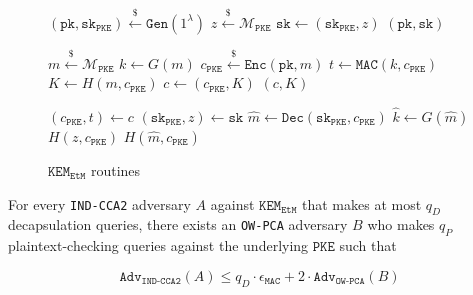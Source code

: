 \documentclass[floatrow,journal=tches,submission]{iacrtrans}
\newcommand{\pke}{\texttt{PKE}}
\newcommand{\keygen}{\texttt{Gen}}
\newcommand{\encrypt}{\texttt{Enc}}
\newcommand{\decrypt}{\texttt{Dec}}
\newcommand{\kem}{\texttt{KEM}}
\newcommand{\encap}{\texttt{Encap}}
\newcommand{\decap}{\texttt{Decap}}
\newcommand{\etm}{\texttt{EtM}}  %
\newcommand{\mac}{\texttt{MAC}}
\newcommand{\pk}{\texttt{pk}}
\newcommand{\sk}{\texttt{sk}}
\newcommand{\leftsample}{\stackrel{\$}{\leftarrow}}
\begin{document}
\begin{figure}[H]
    \center
    \begin{algorithm}[H]
        \caption{$\keygen_\etm$}\label{alg:etm-keygen}
        \begin{algorithmic}[1]
            \State $(\pk, \sk_\pke) \leftsample \keygen(1^\lambda)$
            \State $z \leftsample \mathcal{M}_\pke$
            \State $\sk \leftarrow (\sk_\pke, z)$
            \State \Return $(\pk, \sk)$
        \end{algorithmic}
    \end{algorithm}
    \begin{algorithm}[H]
        \caption{$\encap_\etm(\pk)$}\label{alg:etm-encap}
        \begin{algorithmic}[1]
            \State $m \leftsample \mathcal{M}_\pke$
            \State $k \leftarrow G(m)$
            \State $c_\pke \leftsample \encrypt(\pk, m)$
            \State $t \leftarrow \mac(k, c_\pke)$
            \State $K \leftarrow H(m, c_\pke)$
            \State $c \leftarrow (c_\pke, K)$
            \State \Return $(c, K)$
        \end{algorithmic}
    \end{algorithm}
    \begin{algorithm}[H]
        \caption{$\decap_\etm(\sk, c)$}\label{alg:etm-decap}
        \begin{algorithmic}[1]
            \State $(c_\pke, t) \leftarrow c$
            \State $(\sk_\pke, z) \leftarrow \sk$
            \State $\hat{m} \leftarrow \decrypt(\sk_\pke, c_\pke)$
            \State $\hat{k} \leftarrow G(\hat{m})$
            \If{$\mac(\hat{k}, c_\pke) \neq t$}
                \State \Return $H(z, c_\pke)$
            \EndIf
            \State \Return $H(\hat{m}, c_\pke)$
        \end{algorithmic}
    \end{algorithm}
    \caption{$\kem_\etm$ routines}\label{fig:etm-routines} 
\end{figure}

\begin{theorem}\label{thm:ow-pca-implies-kem-ind-cca2}
    For every \texttt{IND-CCA2} adversary $A$ against $\kem_\etm$ that makes at most $q_D$ decapsulation queries, there exists an \texttt{OW-PCA} adversary $B$ who makes $q_P$ plaintext-checking queries against the underlying $\pke$ such that

    \begin{equation*}
        \texttt{Adv}_\texttt{IND-CCA2}(A) \leq q_D \cdot \epsilon_\mac + 2 \cdot \texttt{Adv}_\texttt{OW-PCA}(B)
    \end{equation*}
\end{theorem}
\end{document}
